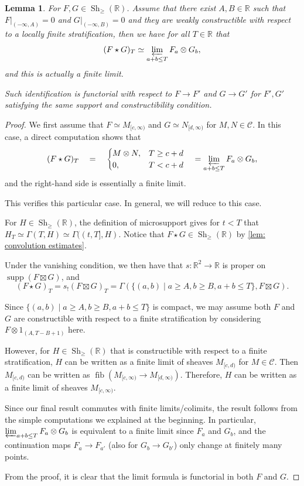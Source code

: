 \documentclass[11pt]{amsart}
\numberwithin{equation}{section}
\theoremstyle{plain}
\newtheorem{Lemma}[lemma]{Lemma}
\theoremstyle{definition}
\theoremstyle{remark}
\newcommand{\bR} { {\mathbb{R}}}
\newcommand{\cC} { {\mathcal{C}}}
\newcommand{\supp}{{\operatorname{supp}}}
\newcommand{\Sh} { {\operatorname{Sh}}}
\newcommand\fib{\operatorname{fib}}
\begin{document}
\begin{Lemma}\label{lemma: stalk formula of sheaf convolution}For $F,G\in \Sh_{\geq } (\bR)$. Assume that there exist $A,B\in \bR$ such that $F|_{(-\infty,A)}=0$ and $G|_{(-\infty,B)}=0$ and they are weakly constructible with respect to a locally finite stratification, then we have for all $T\in \bR$ that
\[(F\star G)_T\simeq   \varprojlim_{a+b\leq T} F_a\otimes G_b,\]
and this is actually a finite limit.

Such identification is functorial with respect to $F\to F'$ and $G\to G'$ for $F',G'$ satisfying the same support and constructibility condition.
\end{Lemma}
\begin{proof}We first assume that $F\simeq M_{[c,\infty)}$ and $G\simeq N_{[d,\infty)}$ for $M, N\in \cC$. In this case, a direct computation shows that 
\[(F\star G)_{T}\quad=\quad \begin{cases}M\otimes N, &T\geq c+d\\ 0, &T<c+d    
\end{cases}\quad =\varprojlim_{a+b\leq T} F_a\otimes G_b,\]
and the right-hand side is essentially a finite limit.

This verifies this particular case. In general, we will reduce to this case.

For $H\in \Sh_{\geq}(\bR)$, the definition of microsupport gives for $t<T$ that $H_T\simeq \Gamma({T},H)\simeq \Gamma((t,T],H)$. Notice that $F \star G \in \Sh_{\geq}(\bR)$ by \autoref{lem: convolution estimates}. 

Under the vanishing condition, we then have that $s:\bR^2\to \bR$ is proper on $\supp(F\boxtimes G)$, and 
\[(F \star G)_T=s_!(F\boxtimes G)_T=\Gamma(\{(a,b)\mid a\geq A,b\geq B,a+b\leq T\},F\boxtimes G).\]

Since $\{(a,b)\mid a\geq A,b\geq B,a+b\leq T\}$ is compact, we may assume both $F$ and $G$ are constructible with respect to a finite stratification by considering $F\otimes 1_{(A,T-B+1)}$ here. 

However, for $H\in \Sh_{\geq}(\bR)$ that is constructible with respect to a finite stratification, $H$ can be written as a finite limit of sheaves $M_{[c,d)}$ for $M\in \cC$. Then $M_{[c,d)}$ can be written as $\fib(M_{[c,\infty)}\to M_{[d,\infty)})$. Therefore, $H$ can be written as a finite limit of sheaves $M_{[c,\infty)}$.

Since our final result commutes with finite limits/colimits, the result follows from the simple computations we explained at the beginning. In particular, $\varprojlim_{a+b\leq T} F_a\otimes G_b$ is equivalent to a finite limit since $F_a$ and $G_b$, and the continuation maps $F_a\to F_{a'}$ (also for $G_b \to G_{b'}$) only change at finitely many points.

From the proof, it is clear that the limit formula is functorial in both $F$ and $G$.\end{proof}
\end{document}
